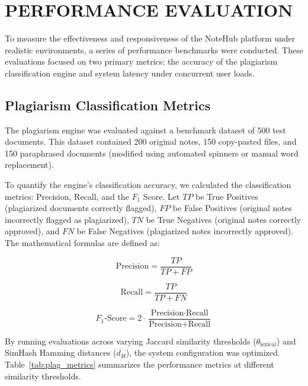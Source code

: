 \documentclass[12,Times new Roman,a4paper]{report}
\begin{document}
\section{PERFORMANCE EVALUATION}

To measure the effectiveness and responsiveness of the NoteHub platform under realistic environments, a series of performance benchmarks were conducted. These evaluations focused on two primary metrics: the accuracy of the plagiarism classification engine and system latency under concurrent user loads.

\subsection{Plagiarism Classification Metrics}
The plagiarism engine was evaluated against a benchmark dataset of 500 test documents. This dataset contained 200 original notes, 150 copy-pasted files, and 150 paraphrased documents (modified using automated spinners or manual word replacement).

To quantify the engine's classification accuracy, we calculated the classification metrics: Precision, Recall, and the $F_1$ Score. Let $TP$ be True Positives (plagiarized documents correctly flagged), $FP$ be False Positives (original notes incorrectly flagged as plagiarized), $TN$ be True Negatives (original notes correctly approved), and $FN$ be False Negatives (plagiarized notes incorrectly approved). The mathematical formulas are defined as:

\begin{equation}
\text{Precision} = \frac{TP}{TP + FP}
\end{equation}

\begin{equation}
\text{Recall} = \frac{TP}{TP + FN}
\end{equation}

\begin{equation}
F_1\text{-Score} = 2 \cdot \frac{\text{Precision} \cdot \text{Recall}}{\text{Precision} + \text{Recall}}
\end{equation}

By running evaluations across varying Jaccard similarity thresholds ($\theta_{\text{lexical}}$) and SimHash Hamming distances ($d_H$), the system configuration was optimized. Table~\ref{tab:plag_metrics} summarizes the performance metrics at different similarity thresholds.
\end{document}
